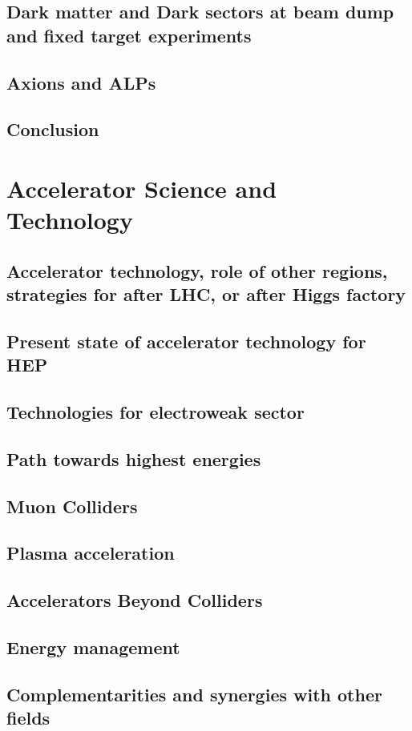 \documentclass[../report.tex]{subfiles}
\begin{document}
\section{Dark matter and Dark sectors at beam dump and fixed target experiments}
\section{Axions and ALPs}
\section{Conclusion}

\chapter{Accelerator Science and Technology}
\section{Accelerator technology, role of other regions, strategies for after LHC, or after Higgs factory}
\section{Present state of accelerator technology for HEP}
\section{Technologies for electroweak sector}
\section{Path towards highest energies}
\section{Muon Colliders}
\section{Plasma acceleration}
\section{Accelerators Beyond Colliders}
\section{Energy management}
\section{Complementarities and synergies with other fields}
\end{document}
